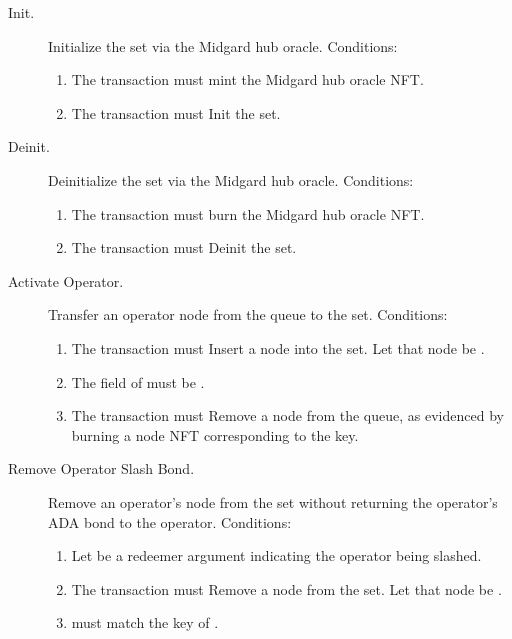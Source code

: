 \documentclass[../midgard.tex]{subfiles}
\begin{document}
\begin{description}
    \item[Init.] Initialize the  set via the Midgard hub oracle. Conditions:
        \begin{enumerate}
            \item The transaction must mint the Midgard hub oracle NFT.
            \item The transaction must Init the  set.
        \end{enumerate}
    \item[Deinit.] Deinitialize the  set via the Midgard hub oracle. Conditions:
        \begin{enumerate}
            \item The transaction must burn the Midgard hub oracle NFT.
            \item The transaction must Deinit the  set.
        \end{enumerate}
    \item[Activate Operator.] Transfer an operator node from the  queue to the  set. Conditions:
        \begin{enumerate}
            \item The transaction must Insert a node into the  set. Let that node be .
            \item The  field of  must be .
            \item The transaction must Remove a node from the  queue, as evidenced by burning a  node NFT corresponding to the  key.
        \end{enumerate}
    \item[Remove Operator Slash Bond.] Remove an operator's node from the  set without returning the operator's ADA bond to the operator. Conditions:
        \begin{enumerate}
            \item Let  be a redeemer argument indicating the operator being slashed.
            \item The transaction must Remove a node from the  set. Let that node be .
            \item {} must match the key of .

\end{enumerate}
\end{description}
\end{document}
